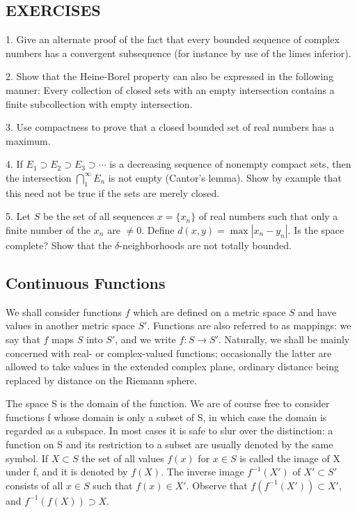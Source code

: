 \subsection*{EXERCISES}
1. Give an alternate proof of the fact that every bounded sequence of complex numbers has a convergent subsequence (for instance by use of the limes inferior).

2. Show that the Heine-Borel property can also be expressed in the following manner: Every collection of closed sets with an empty intersection contains a finite subcollection with empty intersection.

3. Use compactness to prove that a closed bounded set of real numbers has a maximum.

4. If $E_1 \supset E_2 \supset E_3 \supset \cdots$ is a decreasing sequence of nonempty compact sets, then the intersection $\bigcap_{1}^{\infty} E_n$ is not empty (Cantor's lemma). Show by example that this need not be true if the sets are merely closed.

5. Let $S$ be the set of all sequences $x = \{x_n\}$ of real numbers such that only a finite number of the $x_n$ are $\neq 0$. Define $d(x, y) = \max |x_n - y_n|$. Is the space complete? Show that the $\delta$-neighborhoods are not totally bounded.

\setcounter{section}{1}\setcounter{subsection}{4}\subsection{Continuous Functions}\label{sec:3.1.5}
We shall consider functions $f$ which are defined on a metric space $S$ and have values in another metric space $S'$. Functions are also referred to as mappings: we say that $f$ maps $S$ into $S'$, and we write $f: S \to S'$. Naturally, we shall be mainly concerned with real- or complex-valued functions; occasionally the latter are allowed to take values in the extended complex plane, ordinary distance being replaced by distance on the Riemann sphere.

The space S is the domain of the function. We are of course free to consider functions f whose domain is only a subset of S, in which case the domain is regarded as a subspace. In most cases it is safe to slur over the distinction: a function on S and its restriction to a subset are usually denoted by the same symbol. If $X \subset S$ the set of all values $f(x)$ for $x \in S$ is called the image of X under f, and it is denoted by $f(X)$. The inverse image $f^{-1}(X')$ of $X' \subset S'$ consists of all $x \in S$ such that $f(x) \in X'$. Observe that $f(f^{-1}(X')) \subset X'$, and $f^{-1}(f(X)) \supset X$.

